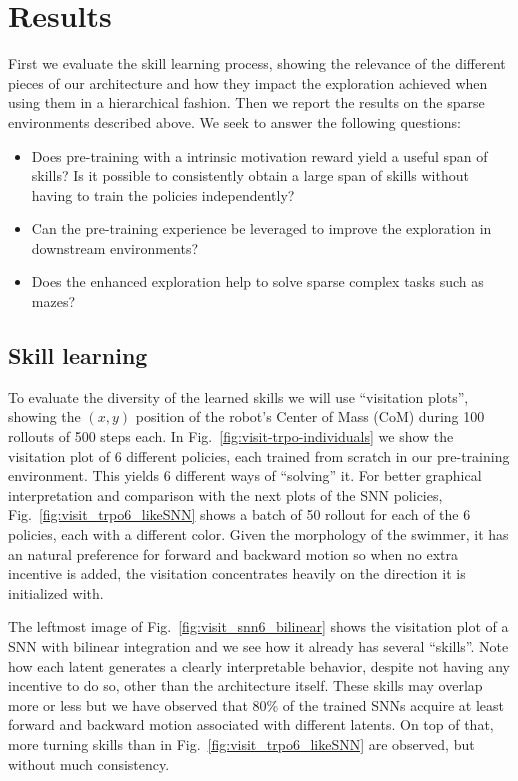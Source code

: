 \documentclass{article} %
\begin{document}
\section{Results}

First we evaluate the skill learning process, showing the relevance of the different pieces of our architecture and how they impact the exploration achieved when using them in a hierarchical fashion. Then we report the results on the sparse environments described above. We seek to answer the following questions:
\begin{itemize}
    \item Does pre-training with a intrinsic motivation reward yield a useful span of skills? Is it possible to consistently obtain a large span of skills without having to train the policies independently?
    \item Can the pre-training experience be leveraged to improve the exploration in downstream environments?
    \item Does the enhanced exploration help to solve sparse complex tasks such as mazes?
\end{itemize}

\subsection{Skill learning}

To evaluate the diversity of the learned skills we will use ``visitation plots'', showing the $(x,y)$ position of the robot's Center of Mass (CoM) during 100 rollouts of 500 steps each. In Fig.\ \ref{fig:visit-trpo-individuals} we show the visitation plot of 6 different policies, each trained from scratch in our pre-training environment. This yields 6 different ways of ``solving'' it. For better graphical interpretation and comparison with the next plots of the SNN policies, Fig.\ \ref{fig:visit_trpo6_likeSNN} shows a batch of 50 rollout for each of the 6 policies, each with a different color. Given the morphology of the swimmer, it has an natural preference for forward and backward motion so when no extra incentive is added, the visitation concentrates heavily on the direction it is initialized with.

The leftmost image of Fig.\ \ref{fig:visit_snn6_bilinear} shows the visitation plot of a SNN with bilinear integration and we see how it already has several ``skills''. Note how each latent generates a clearly interpretable behavior, despite not having any incentive to do so, other than the architecture itself. These skills may overlap more or less but we have observed that 80\% of the trained SNNs acquire at least forward and backward motion associated with different latents. On top of that, more turning skills than in Fig.\ \ref{fig:visit_trpo6_likeSNN} are observed, but without much consistency.
\end{document}
